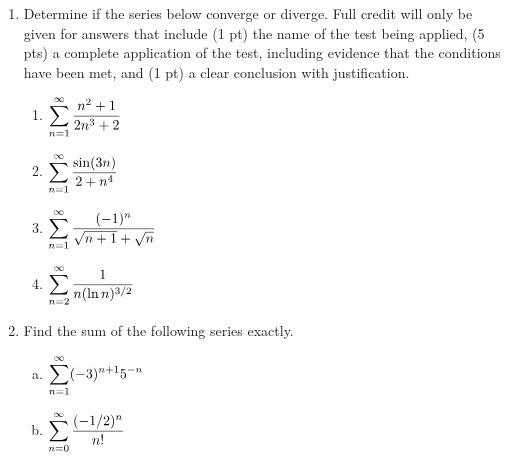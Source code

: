 \documentclass[11pt,fleqn]{article}
\begin{document}
\begin{enumerate}
 \item Determine if the series below converge or diverge. Full credit
  will only be given for answers that include (1 pt) the name of the
  test being applied, (5 pts) a complete application of the test,
  including evidence that the conditions have been met, and (1 pt) a
  clear conclusion with justification.
  
  \begin{enumerate}
  \item $\displaystyle \sum_{n=1}^{\infty} \frac{n^2 + 1}{2n^3 + 2}$

  \item $\displaystyle \sum_{n=1}^{\infty} \frac{ \sin(3n) }{2 + n^4}$
  
  \item $\displaystyle \sum_{n=1}^{\infty} \frac{(-1)^n}{\sqrt{n+1} + \sqrt n}$

  \item $\displaystyle \sum_{n=2}^{\infty} \frac{1}{n (\ln n)^{3/2}}$


  \end{enumerate}

\item Find the sum of the following series exactly. 

  \begin{multicols}{2}{
      \vspace*{-0.45in}
      \begin{enumerate}[a)]
      \item $\displaystyle \sum_{n = 1}^{\infty} (-3)^{n+1}5^{-n}$
      \item $\displaystyle \sum_{n = 0}^{\infty} \frac{(-1/2)^n }{n!}$
      \end{enumerate}}
  \end{multicols}
  \end{enumerate}
  
\end{document}
